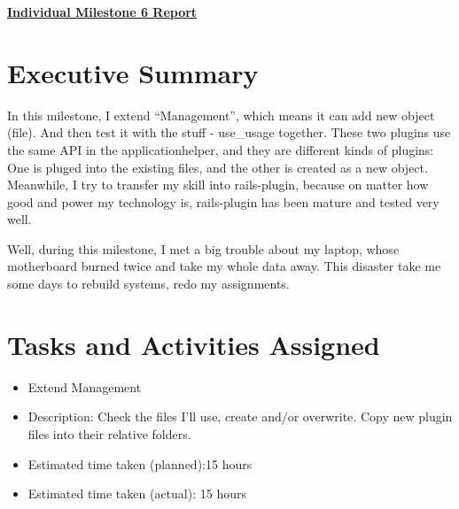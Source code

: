 \documentclass{article}
\begin{document}
\pagestyle{headings}

\begin{center}
{\LARGE\textbf{\underline{{Individual Milestone 6 Report}}}}
\end{center}

\section*{Executive Summary}
In this milestone, I extend ``Management'', which means it can add new object (file). And then test it with the stuff - use\_usage together. These two plugins use the same API in the applicationhelper, and they are different kinds of plugins: One is pluged into the existing files, and the other is created as a new object. Meanwhile, I try to transfer my skill into rails-plugin, because on matter how good and power my technology is, rails-plugin has been mature and tested very well.

Well, during this milestone, I met a big trouble about my laptop, whose motherboard burned twice and take my whole data away. This disaster take me some days to rebuild systems, redo my assignments.
\section*{Tasks and Activities Assigned}

\begin{itemize}
    \item Extend Management
    \item Description: Check the files I'll use, create and/or overwrite. Copy new plugin files into their relative folders.
    \item Estimated time taken (planned):15 hours
    \item Estimated time taken (actual): 15 hours
\end{itemize}
\end{document}
